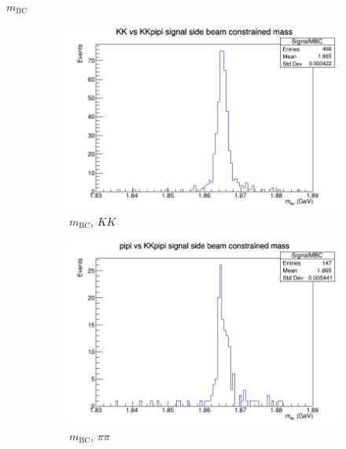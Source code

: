 \documentclass{beamer}
\begin{document}
\begin{frame}{$m_\text{BC}$}
  \begin{figure}
    \centering
    \begin{subfigure}{0.4\textwidth}
      \centering
      \includegraphics[width=\textwidth]{KKSignalMBC.png}
      \caption{$m_\text{BC}$, $KK$}
    \end{subfigure}%
    \begin{subfigure}{0.4\textwidth}
      \centering
      \includegraphics[width=\textwidth]{pipiSignalMBC.png}
      \caption{$m_\text{BC}$, $\pi\pi$}
    \end{subfigure}
    \centering
    \begin{subfigure}{0.4\textwidth}
      \centering

\end{subfigure}
\end{figure}
\end{frame}
\end{document}
